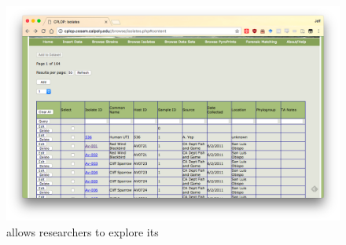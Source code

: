 \begin{figure}
    \centering
    \includegraphics[width=\frontendwidth]{figures/frontend/browse-isolates}
    \caption{\cplop{} allows researchers to explore its \isols{}}
    \label{fig:browse}
\end{figure}